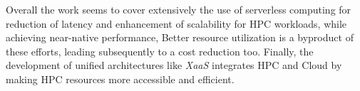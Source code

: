     Overall the work seems to cover extensively the use of serverless computing for reduction of latency and enhancement of scalability for HPC workloads, while achieving near-native performance, Better resource utilization is a byproduct of these efforts, leading subsequently to a cost reduction too. Finally, the development of unified architectures like \textit{XaaS} integrates HPC and Cloud by making HPC resources more accessible and efficient.





